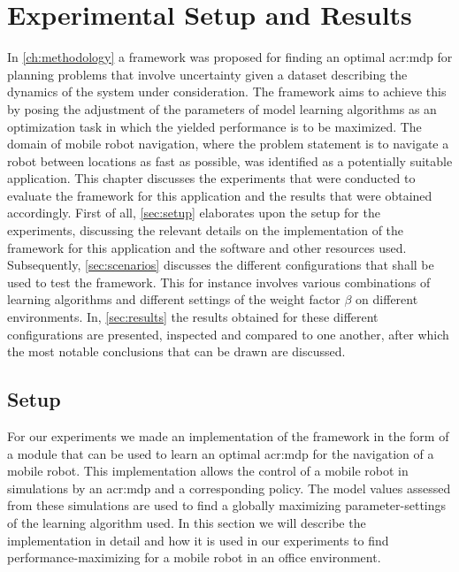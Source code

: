 \chapter{Experimental Setup and Results}
\label{ch:experimental-results}



In \autoref{ch:methodology} a framework was proposed for finding an optimal \acrshort{acr:mdp} for planning problems that involve uncertainty given a dataset describing the dynamics of the system under consideration.
The framework aims to achieve this by posing the adjustment of the parameters of model learning algorithms as an optimization task in which the yielded performance is to be maximized.
The domain of mobile robot navigation, where the problem statement is to navigate a robot between locations as fast as possible, was identified as a potentially suitable application.
This chapter discusses the experiments that were conducted to evaluate the framework for this application and the results that were obtained accordingly.
First of all, \autoref{sec:setup} elaborates upon the setup for the experiments, discussing the relevant details on the implementation of the framework for this application and the software and other resources used.
Subsequently, \autoref{sec:scenarios} discusses the different configurations that shall be used to test the framework.
This for instance involves various combinations of learning algorithms and different settings of the weight factor $\beta$ on different environments.
In, \autoref{sec:results} the results obtained for these different configurations are presented, inspected and compared to one another, after which the most notable conclusions that can be drawn are discussed.

\section{Setup}
\label{sec:setup}

For our experiments we made an implementation of the framework in the form of a module that can be used to learn an optimal \acrshort{acr:mdp} for the navigation of a mobile robot.
This implementation allows the control of a mobile robot in simulations by an \acrshort{acr:mdp} and a corresponding policy.
The model values assessed from these simulations are used to find a globally maximizing parameter-settings of the learning algorithm used.
In this section we will describe the implementation in detail and how it is used in our experiments to find performance-maximizing  for a mobile robot in an office environment.

